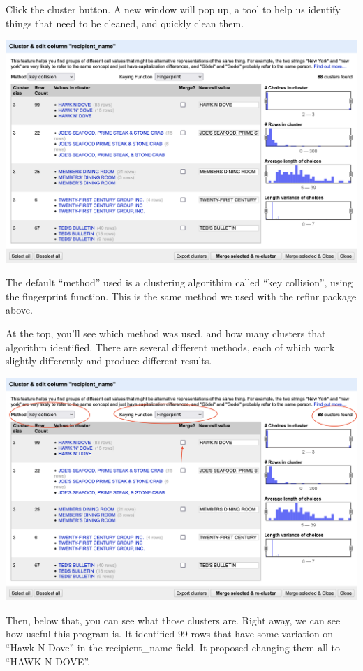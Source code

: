 \documentclass[
  letterpaper,
  DIV=11,
  numbers=noendperiod]{scrreprt}
\begin{document}
Click the cluster button. A new window will pop up, a tool to help us
identify things that need to be cleaned, and quickly clean them.

\includegraphics[width=6.66in,height=\textheight]{./images/open5.png}

The default ``method'' used is a clustering algorithim called ``key
collision'', using the fingerprint function. This is the same method we
used with the refinr package above.

At the top, you'll see which method was used, and how many clusters that
algorithm identified. There are several different methods, each of which
work slightly differently and produce different results.

\includegraphics[width=6.66in,height=\textheight]{./images/open6.png}

Then, below that, you can see what those clusters are. Right away, we
can see how useful this program is. It identified 99 rows that have some
variation on ``Hawk N Dove'' in the recipient\_name field. It proposed
changing them all to ``HAWK N DOVE''.
\end{document}
